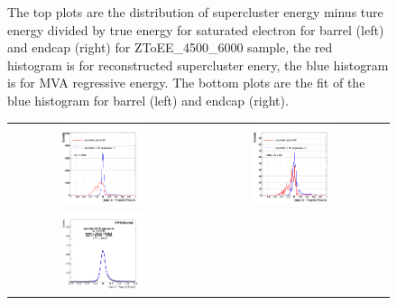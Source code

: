 \begin{figure}[bh]
\begin{center}
\begin{tabular}{cc}
    \end{tabular}
    \caption{ The top plots are the distribution of supercluster energy minus ture energy divided by true energy for saturated electron for barrel (left) and endcap (right) for ZToEE\_4500\_6000 sample, the red histogram is for reconstructed supercluster enery, the blue histogram is for MVA regressive energy. The bottom plots are the fit of the blue histogram for barrel (left) and endcap (right).}
    \label{fig:ZToEE_4500_6000_B_E}
  \end{center}
\end{figure}


\begin{figure}[bh]
  \begin{center}
    \begin{tabular}{cc}
      \includegraphics[width=0.45\textwidth]{chapters/Zprime/Saturation/images/FlatPt/ZToEE_check/6000_Inf/compare_BDTG_Barrel_Endcap_enSC_B_s.png} &
      \includegraphics[width=0.45\textwidth]{chapters/Zprime/Saturation/images/FlatPt/ZToEE_check/6000_Inf/compare_BDTG_Barrel_Endcap_enSC_E_s.png} \\
      \includegraphics[width=0.45\textwidth]{chapters/Zprime/Saturation/images/FlatPt/ZToEE_check/6000_Inf/fit_BDTG_Barrel_Endcap_B_reg_s.png} &

\end{tabular}
\end{center}
\end{figure}
